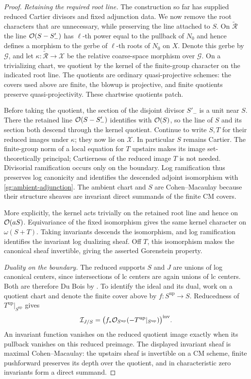 \begin{proof}
\smallskip\noindent\emph{Retaining the required root line.}
The construction so far has supplied reduced Cartier divisors
and fixed adjunction data.  We now remove the root characters
that are unnecessary, while preserving the line attached to $S$.
On $\widetilde{\mathcal R}$ the line $\mathcal{O}(S-S'_-)$ has $\ell$-th power equal to the pullback
of $N_0$ and hence defines a morphism to the gerbe of $\ell$-th
roots of $N_0$ on $X$. Denote this gerbe by $\mathcal G$, and let
$\kappa:\widetilde{\mathcal R}\to\mathcal X$ be the relative
coarse-space morphism over $\mathcal G$. On a trivializing chart, we quotient
by the kernel of the finite-group character on the indicated
root line.  The quotients are ordinary quasi-projective schemes:
the covers used above are finite, the blowup is projective,
and finite quotients preserve quasi-projectivity.  These
chartwise quotients patch.

Before taking the quotient, the section of the disjoint divisor
$S'_-$ is a unit near $S$. There the retained line
$\mathcal{O}(S-S'_-)$ identifies with $\mathcal{O}(S)$, so the line of $S$ and
its section both descend through the kernel quotient. Continue
to write $S,T$ for their reduced images under $\kappa$; they
now lie on $\mathcal X$. In particular $S$
remains Cartier.  The finite-group norm of a local equation
for $T$ upstairs makes its image set-theoretically principal;
Cartierness of the reduced image $T$ is not needed.
Divisorial ramification occurs only on the boundary.  Log
ramification thus preserves log canonicity and identifies the
descended adjoint isomorphism with
\eqref{sg:ambient-adjunction}.  The ambient chart and $S$ are
Cohen--Macaulay because their structure sheaves are invariant
direct summands of the finite CM covers.

More explicitly, the kernel acts trivially on the retained root
line and hence on $\mathcal{O}(aS)$.  Equivariance of the fixed
isomorphism gives the same kernel character on $\omega(S+T)$.
Taking invariants descends the isomorphism, and log ramification
identifies the invariant log dualizing sheaf.  Off $T$, this
isomorphism makes the canonical sheaf invertible, giving the
asserted Gorenstein property.

\smallskip\noindent\emph{Duality on the boundary.}
The reduced supports $S$ and $J$ are unions of log canonical
centers, since intersections of lc centers are again unions
of lc centers.  Both are therefore Du Bois by
\cite[Theorems~1.4 and~1.7]{KollarKovacs2010}.
To identify the ideal and its dual, work on a quotient chart
and denote the finite cover above by $f:S^{\mathrm{up}}\to S$.
Reducedness of $T^{\mathrm{up}}|_{S^{\mathrm{up}}}$ gives
\[
 \mathcal I_{J/S}
 =
 \bigl(f_*\mathcal{O}_{S^{\mathrm{up}}}
       (-T^{\mathrm{up}}|_{S^{\mathrm{up}}})\bigr)^{\mathrm{inv}}.
\]
An invariant function vanishes on the reduced quotient image
exactly when its pullback vanishes on this reduced preimage.
The displayed invariant sheaf is maximal Cohen--Macaulay:
the upstairs sheaf is invertible on a CM scheme, finite
pushforward preserves its depth over the quotient, and in
characteristic zero invariants form a direct summand.


\end{proof}
